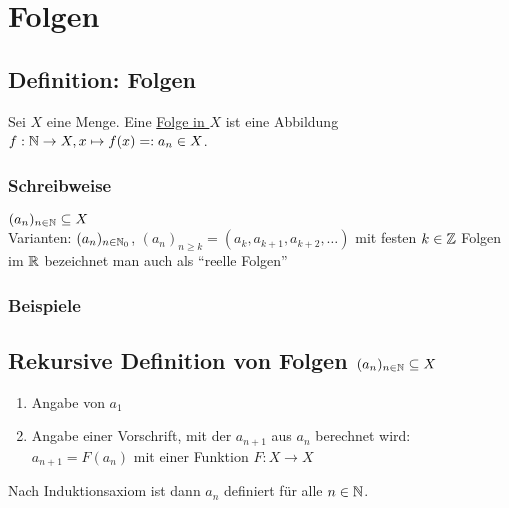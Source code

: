 \fancyhead[R]{}
\chapter{Folgen}\label{P5}
\section{Definition: Folgen}\label{5.1}
Sei $X$ eine Menge. Eine \underline{Folge in $X$} ist eine Abbildung $f: \mathbb{N} \to X, x \mapsto f(x) =: a_n \in X$.

\subsection*{Schreibweise}
$(a_n)_{n \in \mathbb{N}} \subseteq X$\\
Varianten: $(a_n)_{n \in \mathbb{N}_0}$, $(a_n)_{n \ge k} = (a_k, a_{k+1}, a_{k+2}, \hdots)$ mit festen $k \in \mathbb{Z}$\nl
Folgen im $\mathbb{R}$ bezeichnet man auch als ``reelle Folgen''

\subsection*{Beispiele}

\section*{Rekursive Definition von Folgen $(a_n)_{n \in \mathbb{N}} \subseteq X$}
\begin{enumerate}[label=(\Roman*)]
\item Angabe von $a_1$
\item Angabe einer Vorschrift, mit der $a_{n+1}$ aus $a_n$ berechnet wird: $a_{n+1} = F(a_n)$ mit einer Funktion $F: X \to X$
\end{enumerate}
Nach Induktionsaxiom ist dann $a_n$ definiert für alle $n \in \mathbb{N}$.

